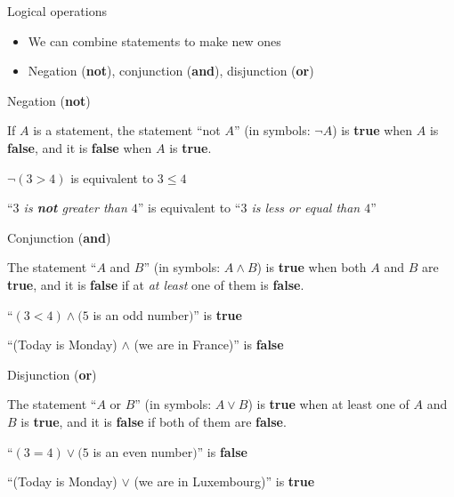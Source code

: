 \documentclass[11pt]{beamer}
\theoremstyle{definition}
\begin{document}
\begin{frame}{Logical operations}
\begin{itemize}
\item We can combine statements to make new ones
\item Negation (\textbf{not}), conjunction (\textbf{and}), disjunction
      (\textbf{or})
\end{itemize}
\end{frame}

\begin{frame}{Negation (\textbf{not})}
\begin{center}
If $A$ is a statement, the statement ``not $A$'' (in symbols: $\neg A$) is
\textbf{true} when $A$ is \textbf{false}, and it is \textbf{false} when $A$ is
\textbf{true}.
\pause
\end{center}

\begin{example}
\begin{center}
$\neg (3>4)$ is equivalent to $3\leq 4$

``\emph{$3$ is \textbf{not} greater than $4$}'' is equivalent to
``\emph{$3$ is less or equal than $4$}''
\end{center}
\end{example}
\end{frame}

\begin{frame}{Conjunction (\textbf{and})}
\begin{center}
The statement ``$A$ and $B$'' (in symbols:
$A\land B$) is \textbf{true} when both $A$ and $B$ are \textbf{true}, and it is
\textbf{false} if at \emph{at least} one of them is \textbf{false}.
\pause

\begin{example}
``$(3<4)\land (5$ is an odd number$)$'' is \textbf{true}
\end{example}

\begin{example}
``(Today is Monday) $\land$ (we are in France)'' is \textbf{false}
\end{example}
\end{center}

\end{frame}

\begin{frame}{Disjunction (\textbf{or})}
\begin{center}
The statement ``$A$ or $B$'' (in symbols:
$A\lor B$) is \textbf{true} when at least one of $A$ and $B$ is \textbf{true},
and it is \textbf{false} if both of them are \textbf{false}.
\pause

\begin{example}
``$(3=4)\lor (5$ is an even number$)$'' is \textbf{false}
\end{example}

\begin{example}
``(Today is Monday) $\lor$ (we are in Luxembourg)'' is \textbf{true}
\end{example}
\end{center}

\end{frame}
\end{document}
